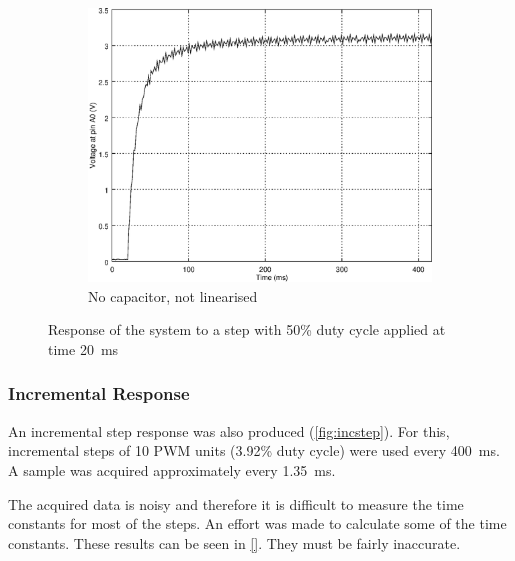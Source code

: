 \begin{figure}[h]
    \begin{subfigure}[t]{0.49\textwidth}
	\centering
	\includegraphics[width=.95\textwidth]{img/step_response_no_capacitor}
	\caption{No capacitor, not linearised}
	\label{fig:step_response_no_capacitor}
    \end{subfigure}
    \caption{Response of the system to a step with 50\% duty cycle applied at time \SI{20}{\milli\second}}
\end{figure}

\subsubsection{Incremental Response}
\label{sub:IncrementalResponse}

An incremental step response was also produced (\autoref{fig:incstep}). For this, incremental steps of 10 PWM units (3.92\% duty cycle) were used every \SI{400}{\milli\second}. A sample was acquired approximately every \SI{1.35}{\milli\second}.

The acquired data is noisy and therefore it is difficult to measure the time constants for most of the steps. An effort was made to calculate some of the time constants. These results can be seen in \autoref{}. They must be fairly inaccurate.

